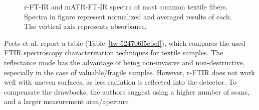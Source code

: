 \documentclass[11pt]{article}
\makeatletter
\def\fixFloatSize#1{}%
\makeatother
\begin{document}
\bgroup
\fixFloatSize{images/1e7c6525-a9ac-4ff7-a4ff-b7128f317966-ufig1_comparison.png}
\begin{figure}[!htbp]
\centering \makeatletter{}
\makeatother 
\caption{{r-FT-IR and mATR-FT-IR spectra of most common textile fibers. Spectra in figure represent normalized and averaged results of each. The vertical axis represents absorbance. \unskip~\protect\cite{693772:16533873}}}
\label{f-cbfac61d0782}
\end{figure}
\egroup
Peets et al. report a table (Table~\ref{tw-524706f5cbef}), which compares the used FTIR spectroscopy characterization techniques for textile samples. The reflectance mode has the advantage of being non-invasive and non-destructive, especially in the case of valuable/fragile samples. However, r-FTIR does not work well with uneven surfaces, as less radiation is reflected into the detector. To compensate the drawbacks, the authors suggest using a higher number of scans, and a larger measurement area/aperture\unskip~\cite{693772:16533873}.
\end{document}
